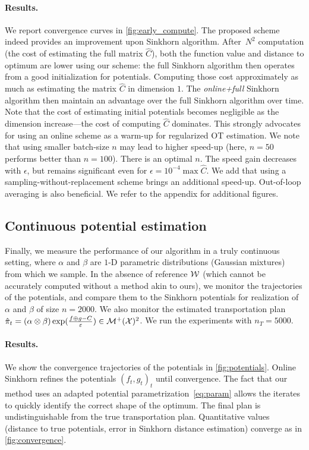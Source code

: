 \paragraph{Results.} We report convergence curves in
\autoref{fig:early_compute}. The proposed scheme indeed provides an improvement
upon Sinkhorn algorithm. After $N^2$ computation (the cost of estimating the
full matrix $\hat C$), both the function value and distance to optimum are lower
using our scheme: the full Sinkhorn algorithm then operates from a good
initialization for potentials. Computing those cost approximately as much as
estimating the matrix $\hat C$ in dimension $1$. The \textit{online+full}
Sinkhorn algorithm then maintain an advantage over the full Sinkhorn algorithm
over time. Note that the cost of estimating initial potentials becomes negligible
as the dimension increase---the cost of computing $\hat C$ dominates. This
strongly advocates for using an online scheme as a warm-up for regularized OT
estimation. We note that using smaller batch-size $n$ may lead to higher speed-up (here, $n=50$ performs better than $n=100$).
There is an optimal $n$. The speed gain decreases with $\epsilon$, but remains
significant even for $\epsilon = 10^{-4} \max \hat C$. We add that
using a sampling-without-replacement scheme brings an additional speed-up. Out-of-loop averaging is also beneficial. We refer to the appendix for additional figures.

\subsection{Continuous potential estimation}

Finally, we measure the performance of our algorithm in a truly continuous
setting, where $\alpha$ and $\beta$ are $1$-D parametric distributions (Gaussian
mixtures) from which we sample. In the absence of reference $\mathcal{W}$ (which cannot be accurately computed
without a method akin to ours), we monitor the
trajectories of the potentials, and compare them to the Sinkhorn potentials for
realization of $\alpha$ and $\beta$ of size $n=2000$. We also monitor the
estimated transportation plan $\hat \pi_t = (\alpha \otimes \beta)
\exp(\frac{f\oplus g - C}{\varepsilon}) \in \mathcal{M}^+(\mathcal{X})^2$. We run the experiments with
$n_T=5000$.

\paragraph{Results.} We show the convergence trajectories of the potentials in
\autoref{fig:potentials}. Online Sinkhorn refines the potentials $(f_t, g_t)_t$ until convergence. The fact that our method uses an adapted potential parametrization~\eqref{eq:param}
allows the iterates to quickly identify the correct shape of the optimum. The
final plan is undistinguishable from the true transportation plan. Quantitative
values (distance to true potentials, error in Sinkhorn distance estimation) converge as in
\autoref{fig:convergence}.

